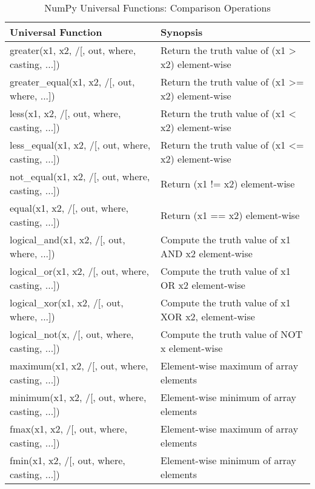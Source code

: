 \documentclass[a4paper,11pt]{book}
\numberwithin{figure}{chapter}
\numberwithin{table}{chapter}
\begin{document}
\begin{appendices}
\begin{table}
\caption{NumPy Universal Functions: Comparison Operations}
\label{tab:numpy_comparison_ufuncs}
\centering
\begin{tabular}{lp{8.5cm}}
\toprule \toprule 
Universal Function & Synopsis \\ \midrule
greater(x1, x2, /[, out, where, casting, ...])
& Return the truth value of (x1 > x2) element-wise\\
greater_equal(x1, x2, /[, out, where, ...])
& Return the truth value of (x1 >= x2) element-wise\\
less(x1, x2, /[, out, where, casting, ...])
& Return the truth value of (x1 < x2) element-wise\\
less_equal(x1, x2, /[, out, where, casting, ...])
& Return the truth value of (x1 <= x2) element-wise\\
not_equal(x1, x2, /[, out, where, casting, ...])
& Return (x1 != x2) element-wise\\
equal(x1, x2, /[, out, where, casting, ...])
& Return (x1 == x2) element-wise\\
logical_and(x1, x2, /[, out, where, ...])
& Compute the truth value of x1 AND x2 element-wise\\
logical_or(x1, x2, /[, out, where, casting, ...])
& Compute the truth value of x1 OR x2 element-wise\\
logical_xor(x1, x2, /[, out, where, ...])
& Compute the truth value of x1 XOR x2, element-wise\\
logical_not(x, /[, out, where, casting, ...])
& Compute the truth value of NOT x element-wise\\
maximum(x1, x2, /[, out, where, casting, ...])
& Element-wise maximum of array elements\\
minimum(x1, x2, /[, out, where, casting, ...])
& Element-wise minimum of array elements\\
fmax(x1, x2, /[, out, where, casting, ...])
& Element-wise maximum of array elements\\
fmin(x1, x2, /[, out, where, casting, ...])
& Element-wise minimum of array elements\\
\bottomrule
\end{tabular}
\end{table}
\clearpage


\end{appendices}
\end{document}
